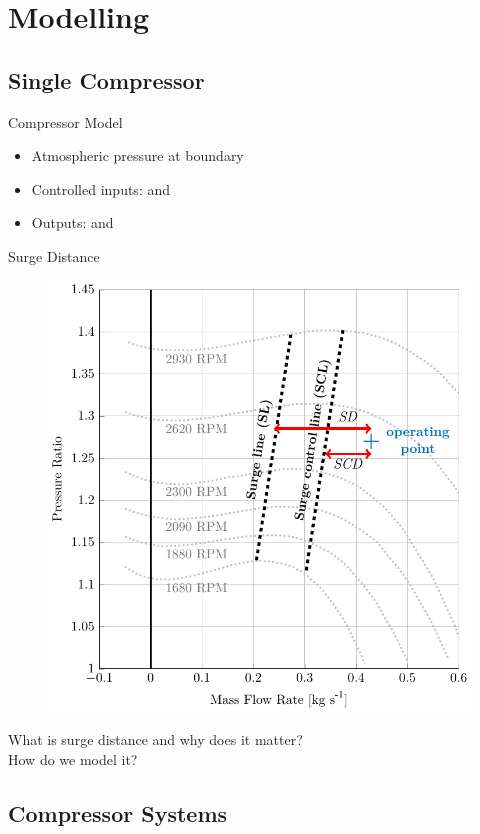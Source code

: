 \section{Modelling}

\subsection{Single Compressor}
\begin{frame}{Compressor Model}
  \begin{minipage}{0.6\linewidth}
    \resizebox{\linewidth}{!}{
      \begin{tikzpicture}
        \drawcomp
      \end{tikzpicture}
    }
  \end{minipage}
  \begin{minipage}{0.38\linewidth}
  \begin{itemize}
    \item Atmospheric pressure at boundary
    \item Controlled inputs:  and 
    \item Outputs:  and 
  \end{itemize}
\end{minipage}
\end{frame}

\begin{frame}{Surge Distance}
  \begin{figure}[H]
    \centering
    \includegraphics[width=.3\linewidth]{figures/surge.pdf}
  \end{figure}
  What is surge distance and why does it matter?\\
  How do we model it?\\
\end{frame}

\subsection{Compressor Systems}

